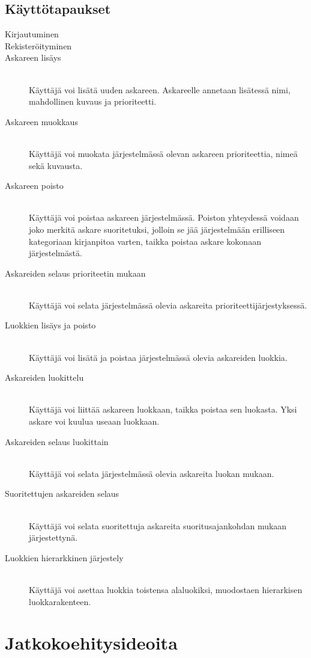 ﻿\documentclass[finnish]{article}
\begin{document}
\subsection{Käyttötapaukset}
\begin{description}
  \item[Kirjautuminen]
  \item[Rekisteröityminen]
  \item[Askareen lisäys] \hfill \\
    Käyttäjä voi lisätä uuden askareen. Askareelle annetaan lisätessä nimi, mahdollinen kuvaus ja prioriteetti.
  \item[Askareen muokkaus] \hfill \\
    Käyttäjä voi muokata järjestelmässä olevan askareen prioriteettia, nimeä sekä kuvausta.
  \item[Askareen poisto] \hfill \\
    Käyttäjä voi poistaa askareen järjestelmässä. Poiston yhteydessä voidaan joko merkitä askare suoritetuksi, jolloin se jää järjestelmään erilliseen kategoriaan kirjanpitoa varten, taikka poistaa askare kokonaan järjestelmästä.
  \item[Askareiden selaus prioriteetin mukaan] \hfill \\
    Käyttäjä voi selata järjestelmässä olevia askareita prioriteettijärjestyksessä.
  \item[Luokkien lisäys ja poisto] \hfill \\
    Käyttäjä voi lisätä ja poistaa järjestelmässä olevia askareiden luokkia.
  \item[Askareiden luokittelu] \hfill \\
    Käyttäjä voi liittää askareen luokkaan, taikka poistaa sen luokasta. Yksi askare voi kuulua useaan luokkaan.
  \item[Askareiden selaus luokittain] \hfill \\
    Käyttäjä voi selata järjestelmässä olevia askareita luokan mukaan.
  \item[Suoritettujen askareiden selaus] \hfill \\
    Käyttäjä voi selata suoritettuja askareita suoritusajankohdan mukaan järjestettynä.
  \item[Luokkien hierarkkinen järjestely] \hfill \\
    Käyttäjä voi asettaa luokkia toistensa alaluokiksi, muodostaen hierarkisen luokkarakenteen.
\end{description}


\section{Jatkokoehitysideoita}
\end{document}
